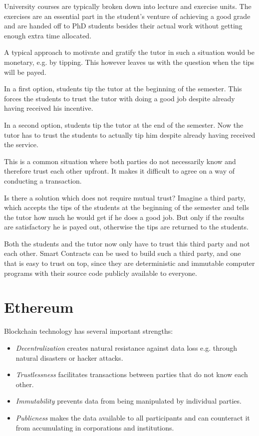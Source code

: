 University courses are typically broken down into lecture and
exercise units. The exercises are an essential part in the student's
venture of achieving a good grade and are handed off to
PhD students besides their actual work without getting enough extra time allocated.

A typical approach to motivate and gratify the tutor in such
a situation would be monetary, e.g. by tipping.
This however leaves us with the question when the tips will be payed.

In a first option, students tip the tutor at the beginning of the semester.
This forces the students to trust the tutor with doing a good
job despite already having received his incentive.

In a second option, students tip the tutor at the end of the semester.
Now the tutor has to trust the students to actually tip him despite already having received the service.

This is a common situation where both parties do not necessarily know and therefore trust each other upfront.
It makes it difficult to agree on a way of conducting a transaction.

Is there a solution which does not require mutual trust?
Imagine a third party, which accepts the tips of the students
at the beginning of the semester and tells the tutor how much he
would get if he does a good job. But only if the results are
satisfactory he is payed out, otherwise the tips are
returned to the students.

Both the students and the tutor now only have to trust this
third party and not each other.
Smart Contracts can be used to build such a third party, and one that is easy to trust on top,
since they are deterministic and immutable computer programs with their source code publicly available to everyone.


\section{Ethereum}

Blockchain technology has several important strengths:

\begin{itemize}
\item {\em Decentralization} creates natural resistance against
  data loss e.g. through natural disasters or hacker attacks.
\item {\em Trustlessness} facilitates transactions between parties that
  do not know each other.
\item {\em Immutability} prevents data from being manipulated by individual
  parties.
\item {\em Publicness} makes the data available to all participants and
  can counteract it from accumulating in corporations and institutions.
\end{itemize}

